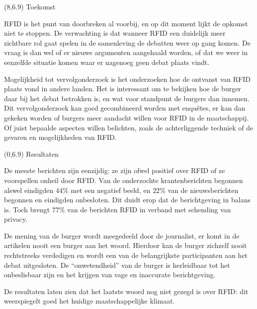 \documentclass[a2]{a0poster}
\begin{document}
\begin{textblock}{7}(8,6.9)
{\LARGE\color{DarkBlue} Toekomst} \small

RFID is het punt van doorbreken al voorbij, en op dit moment lijkt de opkomst niet te stoppen. De verwachting is dat
wanneer RFID een duidelijk meer zichtbare rol gaat spelen in de samenleving de debatten weer op gang komen. De vraag is dan wel of er
nieuwe argumenten aangehaald worden, of dat we weer in eenzelfde situatie komen waar er nagenoeg geen debat plaats vindt.

Mogelijkheid tot vervolgonderzoek is het onderzoeken hoe de ontvanst van RFID plaats vond in andere landen. Het is interessant om te
bekijken hoe de burger daar bij het debat betrokken is, en wat voor standpunt de burgers dan innemen. Dit vervolgonderzoek kan goed
gecombineerd worden met enqu\^etes, er kan dan gekeken worden of burgers meer aandacht willen voor RFID in de maatschappij. Of juist
bepaalde aspecten willen belichten, zoals de achterliggende techniek of de gevaren en mogelijkheden van RFID.
\end{textblock}

\begin{textblock}{7}(0,6.9)
{\LARGE\color{DarkBlue} Resultaten} \small

De meeste berichten zijn eenzijdig: ze zijn ofwel positief over RFID of ze voorspellen onheil door RFID. Van de onderzochte krantenberichten
begonnen alswel eindigden \(44\%\) met een negatief beeld, en \(22\%\) van de nieuwsberichten begonnen en eindigden onbesloten. Dit duidt
erop dat de berichtgeving in balans is. Toch brengt \(77\%\) van de berichten RFID in verband met schending van privacy.

De mening van de burger wordt meegedeeld door de journalist, er komt in de artikelen nooit een burger aan het woord. Hierdoor kan de
burger zichzelf nooit rechtstreeks verdedigen en wordt een van de belangrijkste participanten aan het debat uitgesloten. De ``onwetendheid''
van de burger is herleidbaar tot het onbeslisbaar zijn en het krijgen van vage en inaccurate berichtgeving.

De resultaten laten zien dat het laatste woord nog niet gezegd is over RFID: dit weerspiegelt goed het huidige maatschappelijke klimaat.
\end{textblock}
\end{document}
